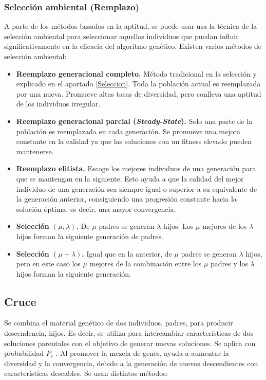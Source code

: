 \subsubsection{Selección ambiental (Remplazo)}

A parte de los métodos basados en la aptitud, se puede usar usa la técnica de la selección ambiental para seleccionar aquellos individuos que puedan influir significativamente en la eficacia del algoritmo genético. Existen varios métodos de selección ambiental:

\begin{itemize}
  \item \textbf{Reemplazo generacional completo.} Método tradicional en la selección y explicado en el apartado \ref{Seleccion}. Toda la población actual es reemplazada por una nueva. Promueve altas tasas de diversidad, pero conlleva una aptitud de los individuos irregular.
  \item \textbf{Reemplazo generacional parcial (\textit{Steady-State}).} Solo una parte de la población es reemplazada en cada generación. Se promueve una mejora constante en la calidad ya que las soluciones con un fitness elevado pueden mantenerse.
  \item \textbf{Reemplazo elitista.} Escoge los mejores individuos de una generación para que se mantengan en la siguiente. Esto ayuda a que la calidad del mejor individuo de una generación sea siempre igual o superior a su equivalente de la generación anterior, consiguiendo una progresión constante hacia la solución óptima, es decir, una mayor convergencia.
  \item \textbf{Selección $(\mu,\lambda)$.} De $\mu$ padres se generan $\lambda$ hijos. Los $\mu$ mejores de los $\lambda$ hijos forman la siguiente generación de padres.
  \item \textbf{Selección $(\mu+\lambda)$.} Igual que en la anterior, de $\mu$ padres se generan $\lambda$ hijos, pero en este caso los $\mu$ mejores de la combinación entre los $\mu$ padres y los $\lambda$ hijos forman la siguiente generación.
\end{itemize}

\subsection{Cruce}

Se combina el material genético de dos individuos, padres, para producir descendencia, hijos. Es decir, se utiliza para intercambiar características de dos soluciones parentales con el objetivo de generar nuevas soluciones. Se aplica con probabilidad \(P_c\) . Al promover la mezcla de genes, ayuda a aumentar la diversidad y la convergencia, debido a la generación de nuevos descendientes con características deseables. Se usan distintos métodos:


